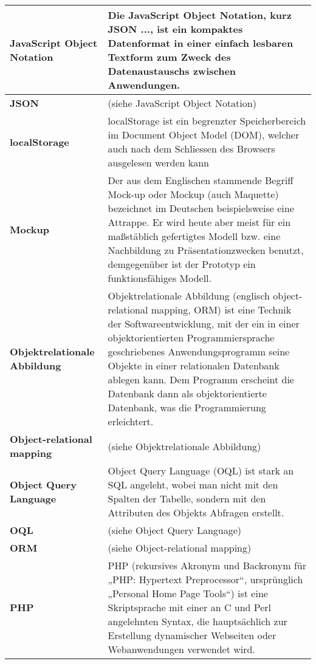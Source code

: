 \begin{longtable}{|m{3cm}|m{11cm}|}
	\textbf{JavaScript Object Notation}&
	Die JavaScript Object Notation, kurz JSON ..., ist ein kompaktes Datenformat in einer einfach lesbaren Textform zum Zweck des Datenaustauschs zwischen Anwendungen.\cite{wiki_json}\\ \hline

	\textbf{JSON}&
	(siehe JavaScript Object Notation)\\ \hline

	\textbf{localStorage}&
	localStorage ist ein begrenzter Speicherbereich im Document Object Model (DOM), welcher auch nach dem Schliessen des Browsers ausgelesen werden kann\\ \hline	

	\textbf{Mockup}&
	Der aus dem Englischen stammende Begriff Mock-up oder Mockup (auch Maquette) bezeichnet im Deutschen beispielsweise eine Attrappe. Er wird heute aber meist für ein maßstäblich gefertigtes Modell bzw. eine Nachbildung zu Präsentationzwecken benutzt, demgegenüber ist der Prototyp ein funktionsfähiges Modell.\cite{wiki_mockup}\\ \hline	

	\textbf{Objektrelationale Abbildung}&
	Objektrelationale Abbildung (englisch object-relational mapping, ORM) ist eine Technik der Softwareentwicklung, mit der ein in einer objektorientierten Programmiersprache geschriebenes Anwendungsprogramm seine Objekte in einer relationalen Datenbank ablegen kann. Dem Programm erscheint die Datenbank dann als objektorientierte Datenbank, was die Programmierung erleichtert. \cite{wiki_orm}\\ \hline	

	\textbf{Object-relational mapping}&
	(siehe Objektrelationale Abbildung)\\ \hline	

	\textbf{Object Query Language}&
	Object Query Language (OQL) ist stark an SQL angeleht, wobei man nicht mit den Spalten der Tabelle, sondern mit den Attributen des Objekts Abfragen erstellt.\\ \hline	

	\textbf{OQL}&
	(siehe Object Query Language)\\ \hline

	\textbf{ORM}&
	(siehe Object-relational mapping)\\ \hline

	\textbf{PHP}&
	PHP (rekursives Akronym und Backronym für „PHP: Hypertext Preprocessor“, ursprünglich „Personal Home Page Tools“) ist eine Skriptsprache mit einer an C und Perl angelehnten Syntax, die hauptsächlich zur Erstellung dynamischer Webseiten oder Webanwendungen verwendet wird.\cite{wiki_php}\\ \hline	


\end{longtable}
